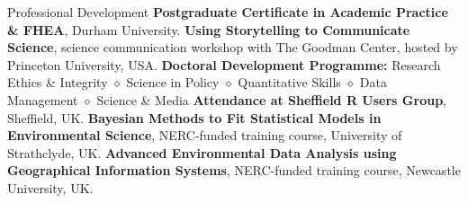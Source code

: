 \begin{rubric}{Professional Development}
\entry*[2023-present] \textbf{Postgraduate Certificate in Academic Practice \& FHEA}, Durham University.
\entry*[2020] \textbf{Using Storytelling to Communicate Science}, science communication workshop with The Goodman Center, hosted by Princeton University, USA.
\entry*[2014 -- 2018] \textbf{Doctoral Development Programme:} Research Ethics \& Integrity $\diamond$ Science in Policy $\diamond$ Quantitative Skills $\diamond$ Data Management $\diamond$ Science \& Media
\entry*[2014 -- 2018] \textbf{Attendance at Sheffield R Users Group}, Sheffield, UK.
\entry*[2016] \textbf{Bayesian Methods to Fit Statistical Models in
Environmental Science}, NERC-funded training course, University of Strathclyde, UK.
\entry*[2015] \textbf{Advanced Environmental Data Analysis using
Geographical Information Systems}, NERC-funded training course, Newcastle University, UK.

\end{rubric}